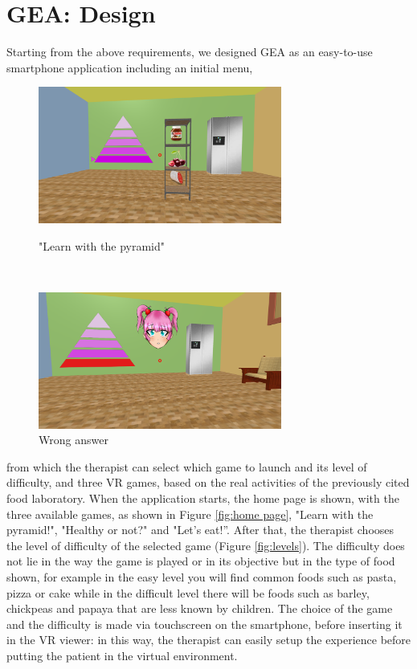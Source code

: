 \documentclass{sigchi-ext}
\begin{document}
\section{GEA: Design}
Starting from the above requirements, we designed GEA as an easy-to-use smartphone application including an initial menu,
\begin{figure}
 \begin{minipage}[c]{\columnwidth}
   \centering
   \includegraphics[width=8cm]{figures/Pyramid1.png}
   \caption{"Learn with the pyramid"}
   \label{fig:Pyramid}
 \end{minipage}
 \ \hspace{2mm} \hspace{3mm} \
 \begin{minipage}[c]{\columnwidth}
  \centering
   \includegraphics[width=8cm]{figures/Wrong.png}
   \caption{Wrong answer}
   \label{fig:wrong}
 \end{minipage}
\end{figure}
 from which the therapist can select which game to launch and its level of difficulty, and three VR games, based on the real activities of the previously cited food laboratory. When the application starts, the home page is shown, with the three available games, as shown in Figure \ref{fig:home page}, "Learn with the pyramid!", "Healthy or not?" and "Let’s eat!”. After that, the therapist chooses the level of difficulty of the selected game (Figure \ref{fig:levels}). The difficulty does not lie in the way the game is played or in its objective but in the type of food shown, for example in the easy level you will find common foods such as pasta, pizza or cake while in the difficult level there will be foods such as barley, chickpeas and papaya that are less known by children. The choice of the game and the difficulty is made via touchscreen on the smartphone, before inserting it in the VR viewer: in this way, the therapist can easily setup the experience before putting the patient in the virtual environment.
\end{document}
